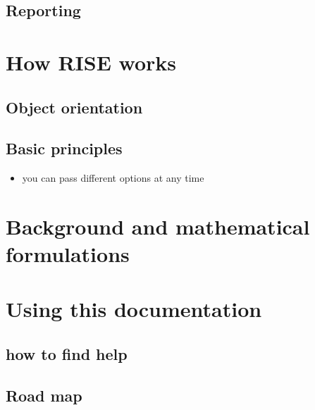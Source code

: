 \documentclass[letterpaper,10pt,english]{sphinxmanual}
\begin{document}
\subsection{Reporting}
\label{intro_folder/rise_capabilities:reporting}

\section{How RISE works}
\label{intro_folder/how_rise_works:how-rise-works}\label{intro_folder/how_rise_works::doc}

\subsection{Object orientation}
\label{intro_folder/how_rise_works:object-orientation}

\subsection{Basic principles}
\label{intro_folder/how_rise_works:basic-principles}\begin{itemize}
\item {} 
you can pass different options at any time

\end{itemize}


\section{Background and mathematical formulations}
\label{intro_folder/background::doc}\label{intro_folder/background:background-and-mathematical-formulations}

\section{Using this documentation}
\label{intro_folder/using_this_doc:using-this-documentation}\label{intro_folder/using_this_doc::doc}

\subsection{how to find help}
\label{intro_folder/using_this_doc:how-to-find-help}

\subsection{Road map}
\label{intro_folder/using_this_doc:road-map}
\end{document}
